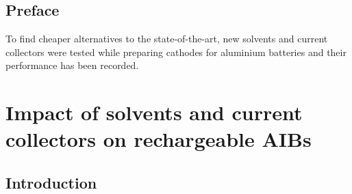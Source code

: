 \section*{Preface}
To find cheaper alternatives to the state-of-the-art, new solvents and current collectors were tested while preparing cathodes for aluminium batteries and their performance has been recorded.   
\newpage

\chapter{Impact of solvents and current collectors on rechargeable AIBs} %
\label{chap7} %

\section{Introduction}

